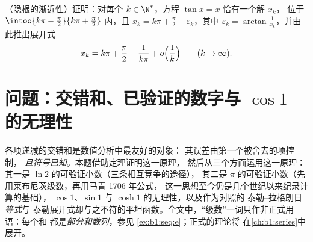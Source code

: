 \begin{exercise}[$\star\star\star$]\label{exo:b1:taylor:12}
（隐根的渐近性）证明：对每个 $k \in
\N^*$，方程 $\tan x = x$ 恰有一个解 $x_k$，
位于 $\intoo{k\pi - \frac\pi2}{k\pi + \frac\pi2}$ 内，且 $x_k = k\pi
+ \frac\pi2 - \varepsilon_k$，其中 $\varepsilon_k =
\arctan\frac{1}{x_k}$，并由此推出展开式
\[
x_k = k\pi + \frac\pi2 - \frac{1}{k\pi} + o\Bigl(\frac
1k\Bigr) \qquad (k \to \infty).
\]
\end{exercise}

\section{问题：交错和、已验证的数字与
$\cos 1$ 的无理性}

\begin{problem}
\label{pb:b1:taylor:1}
各项递减的交错和是数值分析中最友好的对象：
其误差由第一个被舍去的项控制，
\emph{且符号已知}。本题借助定理证明这一原理，
然后从三个方面运用这一原理：
其一是 $\ln 2$ 的可验证小数（三条相互竞争的途径），
其二是 $\pi$ 的可验证小数（先用莱布尼茨级数，再用马青 1706 年公式，
这一思想至今仍是几个世纪以来纪录计算的基础），
$\cos 1$、$\sin 1$ 与 $\cosh 1$ 的无理性，以及作为对照的
泰勒–拉格朗日\emph{等式}与
泰勒展开式却与之不符的平坦函数。全文中，“级数”一词只作非正式用语：每个和
都是\emph{部分和数列}，参见
\cref{ex:b1:seq:e}；正式的理论将
在\cref{ch:b1:series}中展开。


\end{problem}
